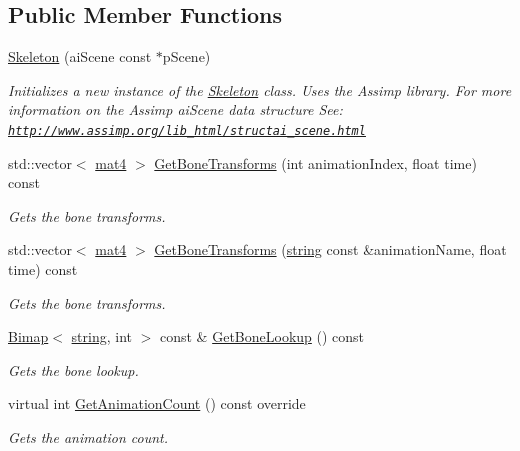 \subsection*{Public Member Functions}
\begin{DoxyCompactItemize}
\item 
\hyperlink{class_skeleton_a4409c43e54759c130bb1f297d1434c93}{Skeleton} (ai\+Scene const $\ast$p\+Scene)
\begin{DoxyCompactList}\small\item\em Initializes a new instance of the \hyperlink{class_skeleton}{Skeleton} class. Uses the Assimp library. For more information on the Assimp ai\+Scene data structure See\+: \href{http://www.assimp.org/lib_html/structai_scene.html}{\tt http\+://www.\+assimp.\+org/lib\+\_\+html/structai\+\_\+scene.\+html} \end{DoxyCompactList}\item 
std\+::vector$<$ \hyperlink{_types_8h_a2db59f395fe82a7394c6324956c265d8}{mat4} $>$ \hyperlink{class_skeleton_a28782f28aa705467ffe19b0cbe60ff17}{Get\+Bone\+Transforms} (int animation\+Index, float time) const 
\begin{DoxyCompactList}\small\item\em Gets the bone transforms. \end{DoxyCompactList}\item 
std\+::vector$<$ \hyperlink{_types_8h_a2db59f395fe82a7394c6324956c265d8}{mat4} $>$ \hyperlink{class_skeleton_a6b9accce448e9780da3149ca04a85a42}{Get\+Bone\+Transforms} (\hyperlink{_types_8h_ad453f9f71ce1f9153fb748d6bb25e454}{string} const \&animation\+Name, float time) const 
\begin{DoxyCompactList}\small\item\em Gets the bone transforms. \end{DoxyCompactList}\item 
\hyperlink{class_bimap}{Bimap}$<$ \hyperlink{_types_8h_ad453f9f71ce1f9153fb748d6bb25e454}{string}, int $>$ const \& \hyperlink{class_skeleton_ad07266c79fbc83a1702f1a47475966de}{Get\+Bone\+Lookup} () const 
\begin{DoxyCompactList}\small\item\em Gets the bone lookup. \end{DoxyCompactList}\item 
virtual int \hyperlink{class_skeleton_a7eee30dae6f47d4e90bd4968608ecea8}{Get\+Animation\+Count} () const  override
\begin{DoxyCompactList}\small\item\em Gets the animation count. \end{DoxyCompactList}\item 

\end{DoxyCompactItemize}
